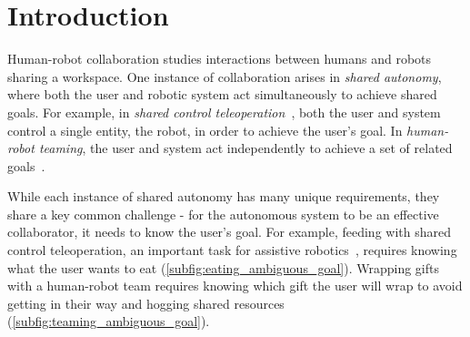 \section{Introduction}
\label{sec:intro}


\graphicspath{{./}{./images/}{./images_rss_2015/}}


Human-robot collaboration studies interactions between humans and robots sharing a workspace. One instance of collaboration arises in \emph{shared autonomy}, where both the user and robotic system act simultaneously to achieve shared goals. For example, in \emph{shared control teleoperation}~\citep{goertz_1963, rosenberg_1993, aigner_1997, debus_2000, dragan_2013_assistive}, both the user and system control a single entity, the robot, in order to achieve the user's goal. In \emph{human-robot teaming}, the user and system act independently to achieve a set of related goals~\citep{hoffman_2007, arai_2010, dragan_2013_legible, koppula_2013, mainprice_2013, gombolay_2014, nikolaidis_2017_mutual}. 

While each instance of shared autonomy has many unique requirements, they share a key common challenge - for the autonomous system to be an effective collaborator, it needs to know the user's goal. For example, feeding with shared control teleoperation, an important task for assistive robotics~\citep{chung_2013}, requires knowing what the user wants to eat (\cref{subfig:eating_ambiguous_goal}). Wrapping gifts with a human-robot team requires knowing which gift the user will wrap to avoid getting in their way and hogging shared resources (\cref{subfig:teaming_ambiguous_goal}). 


